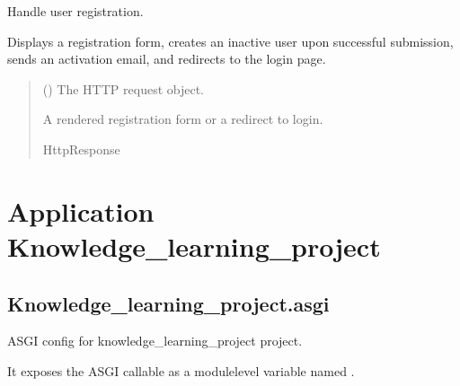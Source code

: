 \documentclass[letterpaper,10pt,english]{sphinxmanual}
\begin{document}
\begin{fulllineitems}
\label{\detokenize{users:users.views.register_view}}
\pysigstartsignatures
\pysiglinewithargsret
{}
{}
{}
\pysigstopsignatures
\sphinxAtStartPar
Handle user registration.

\sphinxAtStartPar
Displays a registration form, creates an inactive user upon successful submission,
sends an activation email, and redirects to the login page.
\begin{quote}\begin{description}
\sphinxAtStartPar
{} () \textendash{} The HTTP request object.

\sphinxAtStartPar
A rendered registration form or a redirect to login.

\sphinxAtStartPar
HttpResponse

\end{description}\end{quote}

\end{fulllineitems}


\sphinxstepscope


\chapter{Application Knowledge\_learning\_project}
\label{\detokenize{knowledge_learning_project:application-knowledge-learning-project}}\label{\detokenize{knowledge_learning_project::doc}}

\section{Knowledge\_learning\_project.asgi}
\label{\detokenize{knowledge_learning_project:module-knowledge_learning_project.asgi}}\label{\detokenize{knowledge_learning_project:knowledge-learning-project-asgi}}
\sphinxAtStartPar
ASGI config for knowledge\_learning\_project project.

\sphinxAtStartPar
It exposes the ASGI callable as a module\sphinxhyphen{}level variable named .
\end{document}
